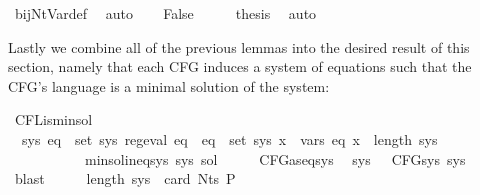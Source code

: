 \begin{isabellebody}
\ bij{\isacharunderscore}{\kern0pt}Nt{\isacharunderscore}{\kern0pt}Var{\isacharunderscore}{\kern0pt}def\ \isamarkupfalse%
\ auto\isanewline
{}\isamarkupfalse%
\isanewline
\ \ \isamarkupfalse%
\ False\isanewline
\ \ \isamarkupfalse%
\ \isamarkupfalse%
\ {\isacharquery}{\kern0pt}thesis\ \isamarkupfalse%
\ auto\isanewline
{}\isamarkupfalse%
%
\endisatagproof
{\isafoldproof}%
%
\isadelimproof
%
\endisadelimproof
%
\begin{isamarkuptext}%
Lastly we combine all of the previous lemmas into the desired result of this section, namely
that each CFG induces a system of  equations such that the CFG's language is a
minimal solution of the system:%
\end{isamarkuptext}\isamarkuptrue%
\isamarkupfalse%
\ CFL{\isacharunderscore}{\kern0pt}is{\isacharunderscore}{\kern0pt}min{\isacharunderscore}{\kern0pt}sol{\isacharcolon}{\kern0pt}\isanewline
\ \ {\isachardoublequoteopen}{\isasymexists}sys{\isachardot}{\kern0pt}\ {\isacharparenleft}{\kern0pt}{\isasymforall}eq\ {\isasymin}\ set\ sys{\isachardot}{\kern0pt}\ reg{\isacharunderscore}{\kern0pt}eval\ eq{\isacharparenright}{\kern0pt}\ {\isasymand}\ {\isacharparenleft}{\kern0pt}{\isasymforall}eq\ {\isasymin}\ set\ sys{\isachardot}{\kern0pt}\ {\isasymforall}x\ {\isasymin}\ vars\ eq{\isachardot}{\kern0pt}\ x\ {\isacharless}{\kern0pt}\ length\ sys{\isacharparenright}{\kern0pt}\isanewline
\ \ \ \ \ \ \ \ \ \ {\isasymand}\ min{\isacharunderscore}{\kern0pt}sol{\isacharunderscore}{\kern0pt}ineq{\isacharunderscore}{\kern0pt}sys\ sys\ sol{\isachardoublequoteclose}\isanewline
%
\isadelimproof
%
\endisadelimproof
%
\isatagproof
{}\isamarkupfalse%
\ {\isacharminus}{\kern0pt}\isanewline
\ \ \isamarkupfalse%
\ CFG{\isacharunderscore}{\kern0pt}as{\isacharunderscore}{\kern0pt}eq{\isacharunderscore}{\kern0pt}sys\ \isamarkupfalse%
\ sys\ \ {\isacharasterisk}{\kern0pt}{\isacharcolon}{\kern0pt}\ {\isachardoublequoteopen}CFG{\isacharunderscore}{\kern0pt}sys\ sys{\isachardoublequoteclose}\ \isamarkupfalse%
\ blast\isanewline
\ \ \isamarkupfalse%
\ \isamarkupfalse%
\ {\isachardoublequoteopen}length\ sys\ {\isacharequal}{\kern0pt}\ card\ {\isacharparenleft}{\kern0pt}Nts\ P{\isacharparenright}{\kern0pt}{\isachardoublequoteclose}\ \isamarkupfalse%

\end{isabellebody}
